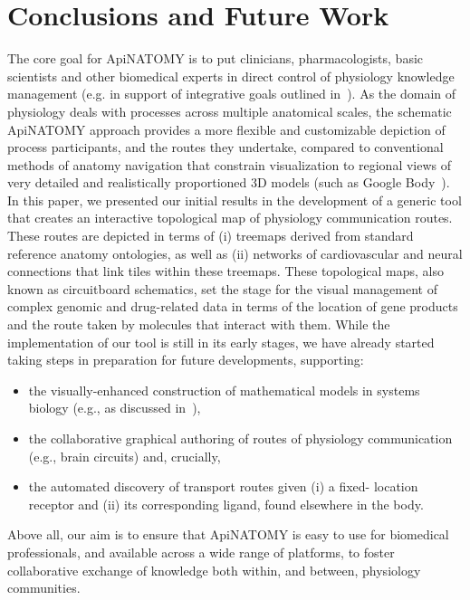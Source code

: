 \section{Conclusions and Future Work} \label{sect:conclusions}                           %

The core goal for ApiNATOMY is to put clinicians, pharmacologists, basic
scientists and other biomedical experts in direct control of physiology
knowledge management (e.g. in support of integrative goals outlined in~\cite{hunter_vision_2010}).
As the domain of physiology deals with processes across multiple anatomical scales,
the schematic ApiNATOMY approach provides a more flexible and customizable
depiction of process participants, and the routes they undertake, compared to
conventional methods of anatomy navigation that constrain visualization to
regional views of very detailed and realistically proportioned 3D models (such as
Google Body~\cite{ZygoteBody}).
In this paper, we presented our initial results in the development of a generic
tool that creates an interactive topological map of physiology communication
routes. These routes are depicted in terms of (i) treemaps derived from standard
reference anatomy ontologies, as well as (ii) networks of cardiovascular and
neural connections that link tiles within these treemaps. These topological maps,
also known as circuitboard schematics, set the stage for the visual management
of complex genomic and drug-related data in terms of the location of gene
products and the route taken by molecules that interact with them. While the
implementation of our tool is still in its early stages, we have already started
taking steps in preparation for future developments, supporting:

\begin{itemize}
  \item the visually-enhanced construction of mathematical models in systems 
biology (e.g., as discussed in~\cite{de_bono_integrating_2012}),
  \item the collaborative graphical authoring of routes of physiology
communication (e.g., brain circuits) and, crucially,
  \item the automated discovery of transport routes given (i) a fixed-
location receptor and (ii) its corresponding ligand, found elsewhere
in the body.
\end{itemize}

Above all, our aim is to ensure that ApiNATOMY is easy to use for biomedical
professionals, and available across a wide range of platforms, to foster
collaborative exchange of knowledge both within, and between, physiology
communities.

